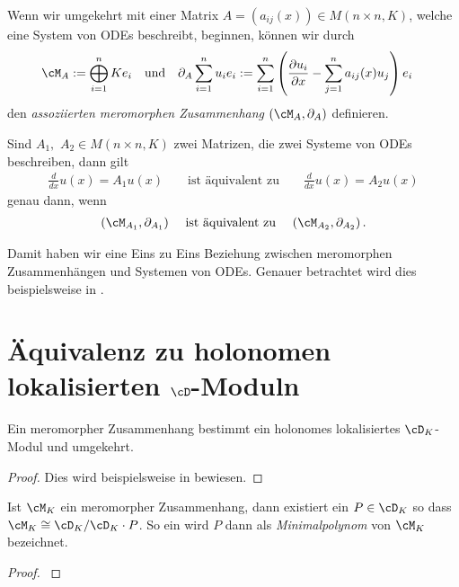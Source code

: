 \begin{defn}
Wenn wir umgekehrt mit einer Matrix $A=(a_{ij}(x))\in M(n\times n,K)$,
welche eine System von ODEs beschreibt, beginnen, können wir durch
\begin{align*}
\cM_A & :=\bigoplus_{i=1}^n Ke_i &&\text{und}
& \partial_A \sum_{i=1}^n u_ie_i &:= \sum_{i=1}^n\left(
  \frac{\partial u_i}{\partial x}-\sum_{j=1}^na_{ij}(x)u_j \right)e_i
\end{align*}
den \emph{assoziierten meromorphen Zusammenhang} $(\cM_A,\partial_A)$ definieren.
\end{defn}
\begin{lem}
Sind $A_1,$ $A_2\in M(n\times n,K)$ zwei Matrizen, die zwei Systeme von ODEs
beschreiben, dann gilt
\begin{align*}
\frac{d}{dx}u(x)=A_1u(x) && \text{ ist äquivalent zu }
  && \frac{d}{dx}u(x)=A_2u(x)
\end{align*}
genau dann, wenn
\begin{align*}
(\cM_{A_1},\partial_{A_1}) && \text{ ist äquivalent zu }
  && (\cM_{A_2},\partial_{A_2}) \,.
\end{align*}
\end{lem}
Damit haben wir eine Eins zu Eins Beziehung zwischen meromorphen
Zusammenhängen und Systemen von ODEs.
Genauer betrachtet wird dies beispielsweise in \cite[Sec 5.1]{hotta2007d}.

\section{Äquivalenz zu holonomen lokalisierten $\cD$-Moduln}
\begin{thm}
Ein meromorpher Zusammenhang bestimmt ein holonomes lokalisiertes
$\cD_K$-Modul und umgekehrt.
\end{thm}
\begin{proof}
Dies wird beispielsweise in \cite[Thm 4.3.2]{sabbah_cimpa90} bewiesen.
\end{proof}

\begin{lemdef}
\cite[Satz 4.12]{ZulaBarbara}
\cite[Thm 4.3.2]{sabbah_cimpa90}
Ist $\cM_K$ ein meromorpher Zusammenhang, dann existiert ein $P\in\cD_K$ so
dass $\cM_K\cong\cD_K/\cD_K\cdot P$. So ein wird $P$ dann als
\emph{Minimalpolynom} von $\cM_K$ bezeichnet.
\end{lemdef}
\begin{proof}
\cite[Satz 4.12]{ZulaBarbara}
\end{proof}
\begin{comment}
\begin{rem}
\cite[Proof of Theorem 5.4.7]{sabbah_cimpa90}
\[
\dim_{\hat K}\cM_{\hat K} =\deg P \mbox{ wenn } \cM_{\hat K}=\cD/\cD\cdot P
\]
\end{rem}
\end{comment}
\begin{comment}
\cite[4.2]{sabbah_cimpa90}
Let $\cM$ be a left $\cD$-module. First we consider it only as a
$\C\{x\}$-module and let $\cM[x^{-1}]$ be the localized module.
\end{comment}

